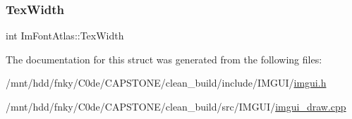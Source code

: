\mbox{\label{structImFontAtlas_a2d0662502433e7a87b3aa4681ba17aa3}} 
\subsubsection{\texorpdfstring{Tex\+Width}{TexWidth}}
{\footnotesize\ttfamily int Im\+Font\+Atlas\+::\+Tex\+Width}



The documentation for this struct was generated from the following files\+:\begin{DoxyCompactItemize}
\item 
/mnt/hdd/fnky/\+C0de/\+C\+A\+P\+S\+T\+O\+N\+E/clean\+\_\+build/include/\+I\+M\+G\+U\+I/\hyperlink{imgui_8h}{imgui.\+h}\item 
/mnt/hdd/fnky/\+C0de/\+C\+A\+P\+S\+T\+O\+N\+E/clean\+\_\+build/src/\+I\+M\+G\+U\+I/\hyperlink{imgui__draw_8cpp}{imgui\+\_\+draw.\+cpp}\end{DoxyCompactItemize}
